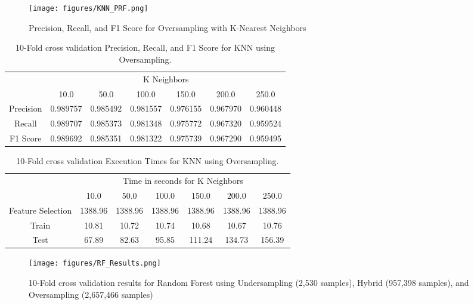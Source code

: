\documentclass[./AutomatedMK.tex]{subfiles}
\begin{document}
        \begin{figure}
            \centering
            \texttt{[image: figures/KNN\_PRF.png]}
            \caption{Precision, Recall, and F1 Score for Oversampling with K-Nearest Neighbors}
            \label{fig:KNNPRF}
        \end{figure}

\begin{table*}
\centering
\caption{10-Fold cross validation Precision, Recall, and F1 Score for KNN using Oversampling.}
\label{tab:PRFKNN}
\begin{tabular}{|c|c|c|c|c|c|c|}
\hline
\multirow{2}{*}{} & \multicolumn{6}{c|}{K Neighbors} \\ 
           &   10.0 &   50.0 &   100.0 &   150.0 &   200.0 &   250.0 \\ \hline
 Precision & 0.989757 & 0.985492 & 0.981557 & 0.976155 & 0.967970 & 0.960448 \\ \hline
 Recall    & 0.989707 & 0.985373 & 0.981348 & 0.975772 & 0.967320 & 0.959524 \\ \hline
 F1 Score  & 0.989692 & 0.985351 & 0.981322 & 0.975739 & 0.967290 & 0.959495 \\ \hline
\end{tabular}
\end{table*}


\begin{table*}
\centering
\caption{10-Fold cross validation Execution Times for KNN using Oversampling.}
\label{tab:KNNT}
\begin{tabular}{|c|c|c|c|c|c|c|}
\hline
\multirow{2}{*}{} & \multicolumn{6}{c|}{Time in seconds for K Neighbors} \\ 
           &   10.0 &   50.0 &   100.0 &   150.0 &   200.0 &   250.0 \\ \hline 
 Feature Selection & 1388.96 & 1388.96 & 1388.96 & 1388.96 & 1388.96 & 1388.96 \\ \hline
 Train             &   10.81 &   10.72 &   10.74 &   10.68 &   10.67 &   10.76 \\ \hline
 Test              &   67.89 &   82.63 &   95.85 &  111.24 &  134.73 &  156.39 \\ \hline
\end{tabular}
\end{table*}


        \begin{figure}
            \centering
            \texttt{[image: figures/RF\_Results.png]}
            \caption{10-Fold cross validation results for Random Forest using Undersampling (2,530 samples), Hybrid (957,398 samples), and Oversampling (2,657,466 samples)}
            \label{fig:RFR}
        \end{figure}
\end{document}
